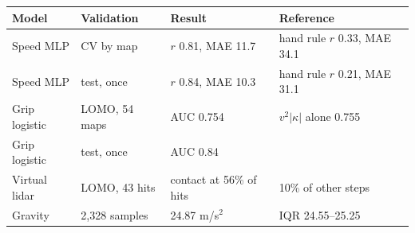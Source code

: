 \begin{tabular}{@{}llll@{}}
\toprule
Model & Validation & Result & Reference \\
\midrule
Speed MLP & CV by map & $r$ 0.81, MAE 11.7 & hand rule $r$ 0.33, MAE 34.1 \\
Speed MLP & test, once & $r$ 0.84, MAE 10.3 & hand rule $r$ 0.21, MAE 31.1 \\
Grip logistic & LOMO, 54 maps & AUC 0.754 & $v^2|\kappa|$ alone 0.755 \\
Grip logistic & test, once & AUC 0.84 &  \\
Virtual lidar & LOMO, 43 hits & contact at 56\% of hits & 10\% of other steps \\
Gravity & 2{,}328 samples & 24.87 m/s$^2$ & IQR 24.55--25.25 \\
\bottomrule
\end{tabular}
